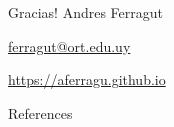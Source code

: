 \documentclass[aspectratio=169]{beamer}
\begin{document}
\begin{frame}[plain]
	\vfill
	{\Huge \alert{Gracias!}}
	\vfill
	Andres Ferragut

	\smallskip

	\href{mailto://ferragut@ort.edu.uy}{\alert{ferragut@ort.edu.uy}}
	
	\smallskip

	\href{http://aferragu.github.io}{\alert{https://aferragu.github.io}}
\end{frame}

\begin{frame}[allowframebreaks]{References}
	
\end{frame}
\end{document}
